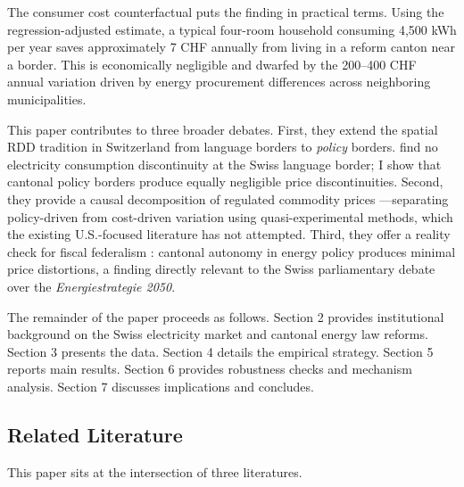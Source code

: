 \documentclass[12pt]{article}
\begin{document}
The consumer cost counterfactual puts the finding in practical terms. Using the regression-adjusted estimate, a typical four-room household consuming 4,500 kWh per year saves approximately 7 CHF annually from living in a reform canton near a border. This is economically negligible and dwarfed by the 200--400 CHF annual variation driven by energy procurement differences across neighboring municipalities.

This paper contributes to three broader debates. First, they extend the spatial RDD tradition in Switzerland \citep{eugster2011demand, eugster2017culture, egger2015causal} from language borders to \textit{policy} borders. \citet{farsi2025energy} find no electricity consumption discontinuity at the Swiss language border; I show that cantonal policy borders produce equally negligible price discontinuities. Second, they provide a causal decomposition of regulated commodity prices \citep{borenstein2012redistribution, ito2014do, davis2014effect}---separating policy-driven from cost-driven variation using quasi-experimental methods, which the existing U.S.-focused literature has not attempted. Third, they offer a reality check for fiscal federalism \citep{oates1972fiscal, besley2003centralized, brulhart2015cohesion}: cantonal autonomy in energy policy produces minimal price distortions, a finding directly relevant to the Swiss parliamentary debate over the \textit{Energiestrategie 2050}.

The remainder of the paper proceeds as follows. Section 2 provides institutional background on the Swiss electricity market and cantonal energy law reforms. Section 3 presents the data. Section 4 details the empirical strategy. Section 5 reports main results. Section 6 provides robustness checks and mechanism analysis. Section 7 discusses implications and concludes.


\subsection{Related Literature}

This paper sits at the intersection of three literatures.
\end{document}
